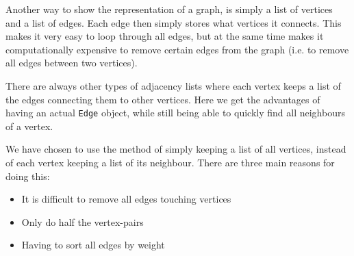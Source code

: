 Another way to show the representation of a graph, is simply a list of vertices and a list of edges. 
Each edge then simply stores what vertices it connects. 
This makes it very easy to loop through all edges, but at the same time makes it computationally expensive to remove certain edges from the graph (i.e. 
to remove all edges between two vertices).

There are always other types of adjacency lists where each vertex keeps a list of the edges connecting them to other vertices. Here we get the advantages of having an actual \lstinline|Edge| object, while still being able to quickly find all neighbours of a vertex.

We have chosen to use the method of simply keeping a list of all vertices, instead of each vertex keeping a list of its neighbour. There are three main reasons for doing this:
\begin{itemize}
	\item It is difficult to remove all edges touching vertices
	\item Only do half the vertex-pairs
	\item Having to sort all edges by weight
\end{itemize}